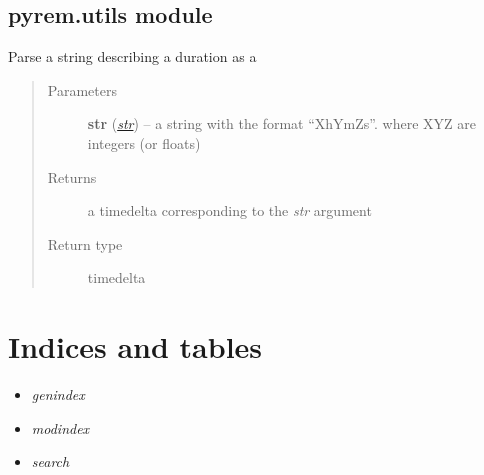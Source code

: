 \documentclass[letterpaper,10pt,english]{sphinxmanual}
\begin{document}

\begin{fulllineitems}
\label{pyrem.io:pyrem.io.signal_from_pkl}
\end{fulllineitems}



\section{pyrem.utils module}
\label{pyrem.utils:pyrem-utils-module}\label{pyrem.utils::doc}\label{pyrem.utils:module-pyrem.utils}

\begin{fulllineitems}
\label{pyrem.utils:pyrem.utils.str_to_time}
Parse a string describing a duration as a \href{http://docs.python.org/2.7/library/datetime.html\#datetime.timedelta}{}
\begin{quote}\begin{description}
\item[{Parameters}] \leavevmode
\textbf{str} (\href{http://docs.python.org/2.7/library/functions.html\#str}{\emph{str}}) -- a string with the format ``XhYmZs''. where XYZ are integers (or floats)

\item[{Returns}] \leavevmode
a timedelta corresponding to the \emph{str} argument

\item[{Return type}] \leavevmode
timedelta

\end{description}\end{quote}

\end{fulllineitems}



\chapter{Indices and tables}
\label{index:indices-and-tables}\begin{itemize}
\item {} 
\emph{genindex}

\item {} 
\emph{modindex}

\item {} 
\emph{search}

\end{itemize}
\end{document}

